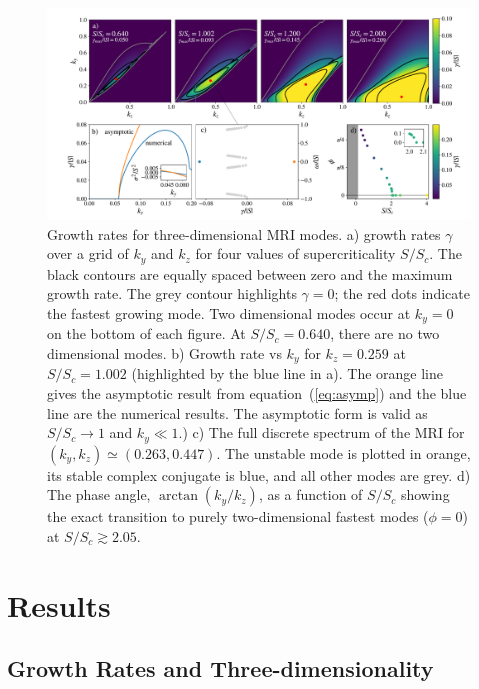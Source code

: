 \documentclass{rsproca_new}%
\newcommand{\SSC}{S/S_{c}}
\begin{document}
\begin{figure}[ht]
  \includegraphics[width=\textwidth]{fig_1.pdf}
  \caption{Growth rates for three-dimensional MRI modes. 
  a) growth rates $\gamma$ over a grid of $k_{y}$ and $k_{z}$ for four values of supercriticality $\SSC$. 
  The black contours are equally spaced between zero and the maximum growth rate.
  The grey contour highlights $\gamma=0$; the red dots indicate the fastest growing mode. 
Two dimensional modes occur at $k_{y} = 0$ on the bottom of each figure.
  At $\SSC=0.640$, there are no two dimensional modes. 
  b) Growth rate vs $k_{y}$ for $k_{z}=0.259$ at $\SSC=1.002$ (highlighted by the blue line in a). 
  The orange line gives the asymptotic result from equation~(\ref{eq:asymp}) and the blue line are the numerical results. 
  The asymptotic form is valid as $\SSC\to1$ and $k_{y}\ll1$.) c) The full discrete spectrum of the MRI for $(k_{y},k_{z})\simeq(0.263,0.447)$. 
  The unstable mode is plotted in orange, its stable complex conjugate is blue, and all other modes are grey. 
  d) The phase angle, $\arctan(k_{y}/k_{z})$, as a function of $\SSC$ showing the exact transition to purely two-dimensional fastest modes ($\phi=0$) at $\SSC\gtrsim2.05$. }
  \label{fig:growth_rate}
\end{figure}

\section{Results}
\label{sec:results}

\subsection{Growth Rates and Three-dimensionality}
\label{sec:growth}
\end{document}
